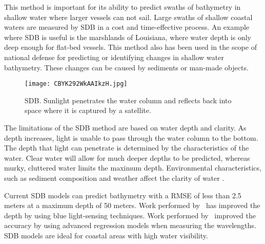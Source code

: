 \par
This method is important for its ability to predict swaths of bathymetry in shallow water where larger vessels can not sail.
Large swaths of shallow coastal waters are measured by \ac{SDB} in a cost and time-effective process.
An example where \ac{SDB} is useful is the marshlands of Louisiana, where water depth is only deep enough for flat-bed vessels.
This method also has been used in the scope of national defense for predicting or identifying changes in shallow water bathymetry.
These changes can be caused by sediments or man-made objects. \\

\begin{figure}[htp]
    \centering
    \texttt{[image: CBYK292WkAAIkzH.jpg]}
    \caption{\ac{SDB}.
    Sunlight penetrates the water column and reflects back into space where it is captured by a satellite.}
    \label{fig:sdb}
\end{figure} 

\medskip


\par
The limitations of the \ac{SDB} method are based on water depth and clarity.
As depth increases, light is unable to pass through the water column to the bottom.
The depth that light can penetrate is determined by the characteristics of the water.
Clear water will allow for much deeper depths to be predicted, whereas murky, cluttered water limits the maximum depth.
Environmental characteristics, such as sediment composition and weather affect the clarity of water \cite{vinayaraj2016satellite}.

\par
Current \ac{SDB} models can predict bathymetry with a \ac{RMSE} of less than 2.5 meters at a maximum depth of 50 meters.
Work performed by~\cite{vinayaraj2016satellite} has improved the depth by using blue light-sensing techniques.
Work performed by~\cite{chybicki2018three} improved the accuracy by using advanced regression models when measuring the wavelengths.
\ac{SDB} models are ideal for coastal areas with high water visibility.

